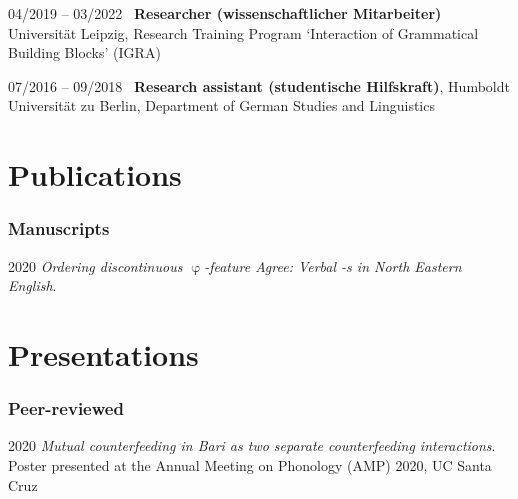 \documentclass[11pt]{article}
\begin{document}
\begin{list}{}{
	\setlength{\leftmargin}{3.5cm}
	\setlength{\itemindent}{-2.5cm}
	}

	\item[04/2019 -- 03/2022~] \textbf{Researcher (wissenschaftlicher Mitarbeiter)} Universität Leipzig, Research Training Program `Interaction of Grammatical Building Blocks' (IGRA)
	
	\item[07/2016 -- 09/2018~] \textbf{Research assistant (studentische Hilfskraft)}, Humboldt Universität zu Berlin, Department of German Studies and Linguistics

\end{list}




\section*{Publications}
%	
\vspace{-1em}
\subsubsection*{Manuscripts}
\begin{list}{}{
		\setlength{\leftmargin}{3.5cm}
		\setlength{\itemindent}{-2.5cm}
	}
	
	\item[2020\phantom{~--~03/2022/04~}] \textit{Ordering discontinuous $\upvarphi$-feature Agree: Verbal -s in North Eastern English}.
\end{list}


\section*{Presentations}
\vspace{-1em}
\subsubsection*{Peer-reviewed}
\begin{list}{}{
		\setlength{\leftmargin}{3.5cm}
		\setlength{\itemindent}{-2.5cm}
	}
	
	\item[2020\phantom{~--~03/2022/04~}] \textit{Mutual counterfeeding in Bari as two separate counterfeeding interactions}. Poster presented at the Annual Meeting on Phonology (AMP) 2020, UC Santa Cruz
\end{list}
\end{document}
